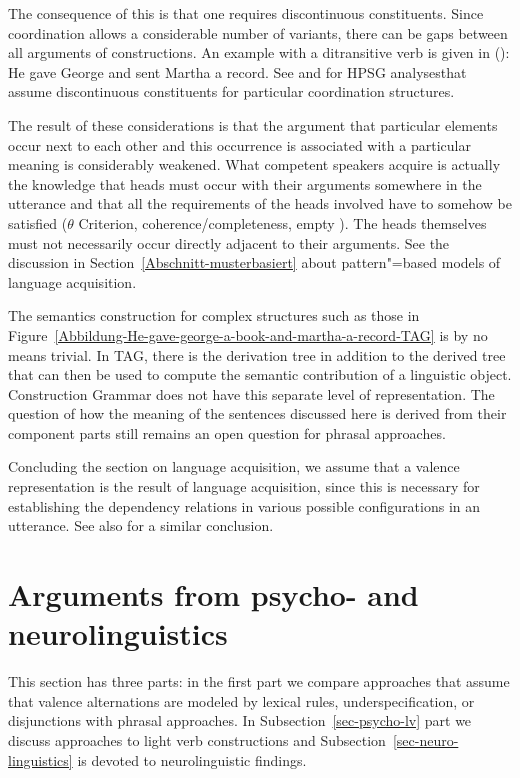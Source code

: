 \begin{exe}
\begin{xlist}[iv.]
\begin{exe}
\begin{xlist}[iv.]
\noindent
The consequence of this is that one requires discontinuous constituents. Since coordination allows a considerable number
of variants, there can be gaps between all arguments of constructions. An example with a ditransitive verb is given in ():
\ea
He gave George and sent Martha a record.
\z
See  and  for HPSG analyses\indexhpsg that assume discontinuous constituents for particular
coordination structures.

The result of these considerations is that the argument that particular elements occur next to each other and this occurrence is associated with a particular meaning
is considerably weakened. What competent speakers acquire is actually the knowledge that heads must
occur with their arguments somewhere in the utterance and that all the requirements of the heads involved have to somehow be satisfied ($\theta$ Criterion, coherence/completeness, empty \subcatl). 
The heads themselves must not necessarily occur directly adjacent to their arguments. See the discussion in Section~\ref{Abschnitt-musterbasiert} about pattern"=based
models of language acquisition.

The semantics construction for complex structures such as those in Figure~\ref{Abbildung-He-gave-george-a-book-and-martha-a-record-TAG} is by no means
trivial. In TAG\indextag, there is the derivation tree in addition to the derived tree that can then be used to compute the semantic contribution of a linguistic
object. Construction Grammar does not have this separate level of representation. The question of how the meaning of the sentences discussed here is derived from
their component parts still remains an open question for phrasal approaches.

Concluding the section on language acquisition, we assume that a valence representation is the
result of language acquisition, since this is necessary for establishing the dependency relations in
various possible configurations in an utterance. See also  for a similar conclusion. 

\section{Arguments from psycho- and neurolinguistics}

This section has three parts: in the first part we compare approaches that assume that valence
alternations are modeled by lexical rules, underspecification, or disjunctions with phrasal
approaches. In Subsection~\ref{sec-psycho-lv} part we discuss approaches to light verb constructions and Subsection~\ref{sec-neuro-linguistics}
is devoted to neurolinguistic findings.



\end{xlist}
\end{exe}
\end{xlist}
\end{exe}
